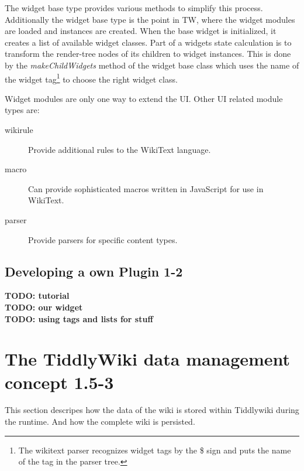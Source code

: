 \documentclass[12pt,a4paper]{scrartcl}
\newcommand{\todo}[1]{{\bf TODO: #1}\\
}
\begin{document}
The widget base type provides various methods to simplify this process.
Additionally the widget base type is the point in TW, where the widget modules are loaded and instances are created.
When the base widget is initialized, it creates a list of available widget classes.
Part of a widgets state calculation is to transform the render-tree nodes of its children to widget instances.
This is done by the \textit{makeChildWidgets} method of the widget base class which uses the name of the widget tag\footnote{The wikitext parser recognizes widget tags by the \$ sign and puts the name of the tag in the parser tree.} to choose the right widget class.

Widget modules are only one way to extend the UI. Other UI related module types are:
\begin{description}
\item[wikirule] Provide additional rules to the WikiText language.
\item[macro] Can provide sophisticated macros written in JavaScript for use in WikiText.
\item[parser] Provide parsers for specific content types.
\end{description}

\subsection{Developing a own Plugin 1-2}
\todo{tutorial}
\todo{our widget}
\todo{using tags and lists for stuff}
\newpage
\section{The TiddlyWiki data management concept 1.5-3}
This section descripes how the data of the wiki is stored within Tiddlywiki during the runtime. And how the complete wiki is persisted.
\end{document}
